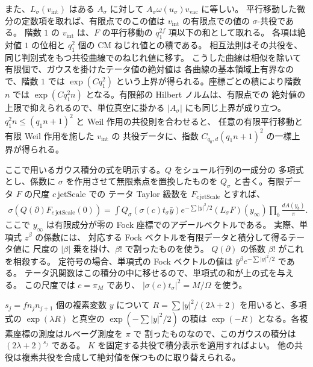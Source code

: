 また、\(L_\sigma(v_\mathrm{int})\) はある \(A_\sigma\) に対して
\(A_\sigma\omega(u_\sigma)v_\mathrm{vac}\) に等しい。
平行移動した微分の定数項を取れば、有限点でのこの値は
\(v_\mathrm{int}\) の有限点での値の \(\sigma\)-共役である。
階数 \(1\) の \(v_\mathrm{int}\) は、\(F\) の平行移動の \(q_1^{2f}\) 項以下の和として取れる。
各項は絶対値 \(1\) の位相と \(q_1^2\) 個の CM ねじれ値との積である。
相互法則はその共役を、同じ判別式をもつ共役曲線でのねじれ値に移す。
こうした曲線は相似を除いて有限個で、ガウスを掛けたテータ値の絶対値は
各曲線の基本領域上有界なので、階数 \(1\) では \(\exp(C q_1^2)\)
という上界が得られる。座標ごとの積により階数 \(n\) では
\(\exp(Cq_1^2n)\) となる。有限部の Hilbert ノルムは、有限点での
絶対値の上限で抑えられるので、単位真空に掛かる \(|A_\sigma|\) にも同じ上界が成り立つ。
\(q_1^2 n\le(q_1n+1)^2\) と Weil 作用の共役則を合わせると、
任意の有限平行移動と有限 Weil 作用を施した \(v_\mathrm{int}\) の
共役データに、指数 \(C_{q_0,d}(q_1 n+1)^2\) の一様上界が得られる。

ここで用いるガウス積分の式を明示する。\(Q\) をシュール行列の一成分の
多項式とし、係数に \(\sigma\) を作用させて無限素点を置換したものを
\(Q_\sigma\) と書く。有限データ \(F\) の尺度 \(c\,\mathrm{jetScale}\) での
テータ Taylor 級数を \(F_{c\,\mathrm{jetScale}}\) とすれば、
\begin{align*}
 \sigma\!\left(Q(\partial)F_{c\,\mathrm{jetScale}}(0)\right)
  =\int Q_\sigma\!\left(\sigma(c)t_\sigma\bar y\right)
       e^{-\sum|y|^2/2}(L_\sigma F)(y_\infty)
       \prod_b \frac{dA(y_b)}{\pi}.
\end{align*}
ここで \(y_\infty\) は有限成分が零の Fock 座標でのアデールベクトルである。
実際、単項式 \(z^\beta\) の係数には、
対応する Fock ベクトルを有限データと積分して得るテータ値に
尺度の \(|\beta|\) 乗を掛け、\(\beta!\) で割ったものを使う。
\(Q(\partial)\) の係数 \(\beta!\) がこれを相殺する。
定符号の場合、単項式の Fock ベクトルの値は
\(\bar y^\beta e^{-\sum |y|^2/2}\) である。
テータ汎関数はこの積分の中に移せるので、単項式の和が上の式を与える。
この尺度では \(c=\pi_M\) であり、
\(|\sigma(c)t_\sigma|^2=M/\Omega\) を使う。

\(s_j=f n_j n_{j+1}\) 個の複素変数 \(y\) について
\(R=\sum|y|^2/(2\lambda+2)\) を用いると、多項式の
\(\exp(\lambda R)\) と真空の \(\exp(-\sum|y|^2/2)\) の積は
\(\exp(-R)\) となる。各複素座標の測度はルベーグ測度を \(\pi\) で
割ったものなので、このガウスの積分は \((2\lambda+2)^{s_j}\) である。
\(K\) を固定する共役で積分表示を適用すればよい。
他の共役は複素共役を合成して絶対値を保つものに取り替えられる。

